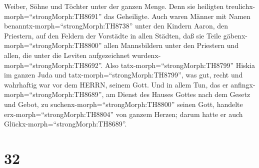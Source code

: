Weiber, Söhne und Töchter unter der ganzen Menge. Denn sie heiligten
treulichx-morph=``strongMorph:TH8691'' das Geheiligte. 
Auch waren Männer mit Namen benanntx-morph=``strongMorph:TH8738'' unter
den Kindern Aaron, den Priestern, auf den Feldern der Vorstädte in allen
Städten, daß sie Teile gäbenx-morph=``strongMorph:TH8800'' allen
Mannsbildern unter den Priestern und allen, die unter die Leviten
aufgezeichnet wurdenx-morph=``strongMorph:TH8692''.  Also
tatx-morph=``strongMorph:TH8799'' Hiskia im ganzen Juda und
tatx-morph=``strongMorph:TH8799'', was gut, recht und wahrhaftig war vor
dem HERRN, seinem Gott.  Und in allem Tun, das er
anfingx-morph=``strongMorph:TH8689'', am Dienst des Hauses Gottes nach
dem Gesetz und Gebot, zu suchenx-morph=``strongMorph:TH8800'' seinen
Gott, handelte erx-morph=``strongMorph:TH8804'' von ganzem Herzen; darum
hatte er auch Glückx-morph=``strongMorph:TH8689''.

\hypertarget{section-31}{%
\section{32}\label{section-31}}

